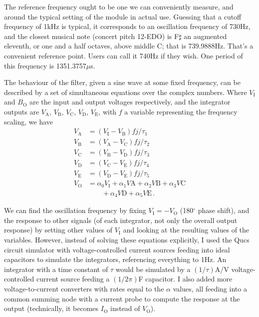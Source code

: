 The reference frequency ought to be one we can conveniently measure, and
around the typical setting of the module in actual use.  Guessing that a
cutoff frequency of 1kHz is typical, it corresponds to an oscillation
frequency of 730Hz, and the closest musical note (concert pitch 12-EDO) is
F$\sharp$ an augmented eleventh, or one and a half octaves, above middle C;
that is 739.9888Hz.  That's a
convenient reference point.  Users can call it 740Hz if they wish.  One
period of this frequency is 1351.3757$\mu$s.

The behaviour of the filter, given a sine wave at some fixed frequency, can
be described by a set of simultaneous equations over the complex numbers. 
Where $V_\textrm{I}$ and $B_\textrm{O}$ are the input and output voltages
respectively, and the integrator outputs are $V_\textrm{A}$, $V_\textrm{B}$,
$V_\textrm{C}$, $V_\textrm{D}$, $V_\textrm{E}$, with $f$ a variable
representing the frequency scaling, we have
\begin{align*}
  V_\textrm{A} &= (V_\textrm{I}-V_\textrm{B})fj/\tau_1 \\
  V_\textrm{B} &= (V_\textrm{A}-V_\textrm{C})fj/\tau_2 \\
  V_\textrm{C} &= (V_\textrm{B}-V_\textrm{D})fj/\tau_3 \\
  V_\textrm{D} &= (V_\textrm{C}-V_\textrm{E})fj/\tau_4 \\
  V_\textrm{E} &= (V_\textrm{D}-V_\textrm{E})fj/\tau_5 \\
  V_\textrm{O} &= \alpha_0V_\textrm{I}+\alpha_1V\textrm{A}
    +\alpha_2V\textrm{B}+\alpha_3V\textrm{C} \\
    & \quad\quad +\alpha_4V\textrm{D} +\alpha_5V\textrm{E} \, .
\end{align*}

We can find the oscillation frequency by fixing $V_\textrm{I}=-V_\textrm{O}$
(180$^\circ$ phase shift), and the response to other signals (of each
integrator, not only the overall output response) by setting other values of
$V_\textrm{I}$ and looking at the resulting values of the variables. 
However, instead of solving these equations explicitly, I used the Qucs
circuit simulator with voltage-controlled current sources feeding into ideal
capacitors to simulate the integrators, referencing everything to 1Hz.  An
integrator with a time constant of $\tau$ would be simulated by a
$(1/\tau)$A/V voltage-controlled current source feeding a $(1/2\pi)$F
capacitor.  I also added more voltage-to-current converters with rates equal
to the $\alpha$ values, all feeding into a common summing node with a
current probe to compute the response at the output (technically, it becomes
$I_\textrm{O}$ instead of $V_\textrm{O}$).

